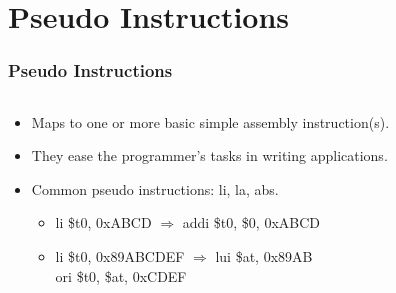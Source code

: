 \documentclass[
	10pt, %
	hmargin=1cm,vmargin=0cm,head=0.5cm,headsep=0pt,foot=0.5cm,margin=2cm
]{beamer}
\begin{document}
\section{Pseudo Instructions}
\begin{frame}
	\frametitle{Pseudo Instructions}
	
	\begin{columns}[c]
		
		\begin{column}{0.7\textwidth}
			\begin{itemize}
				\item Maps to one or more basic simple assembly instruction(s). \pause
				\item They ease the programmer's tasks in writing applications. \pause
				\item Common pseudo instructions: li, la, abs. \pause
					\begin{itemize}
						\item \color{blue}li \color{red}\$t0\color{black}, 0xABCD \hspace{0.62cm} \( \Rightarrow \) 	\color{blue}addi \color{red}\$t0\color{black}, \color{red}\$0\color{black}, 0xABCD \pause
						\item \color{blue}li \color{red}\$t0\color{black}, 0x89ABCDEF 	\( \Rightarrow \) 	\color{blue}lui \color{red}\$at\color{black}, 0x89AB \\ 
						\hspace{3.15cm} \color{blue}ori \color{red}\$t0\color{black}, \color{red}\$at\color{black}, 0xCDEF \pause
					\end{itemize}
			\end{itemize}
		\end{column}


\end{columns}
\end{frame}
\end{document}
